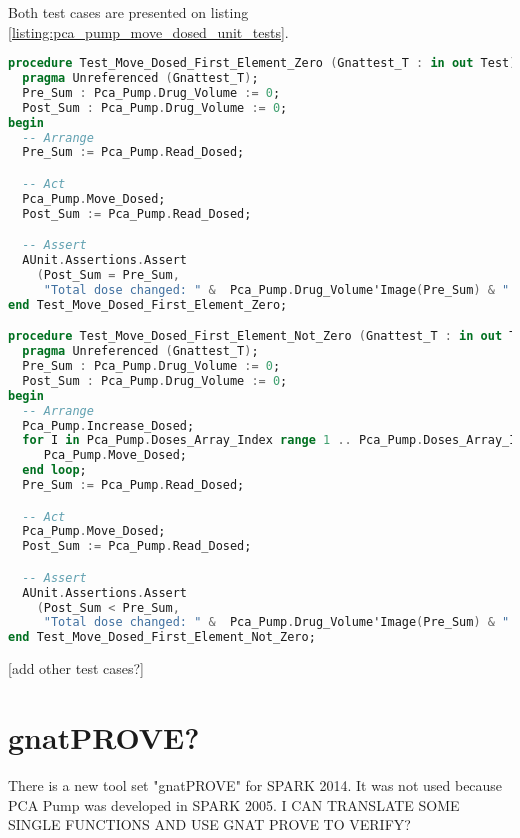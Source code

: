 Both test cases are presented on listing \ref{listing:pca_pump_move_dosed_unit_tests}.

\begin{lstlisting}[language=ada, frame=single, gobble=0, caption={AUnit tests for Move\_Dosed procedure}, label={listing:pca_pump_move_dosed_unit_tests}]
procedure Test_Move_Dosed_First_Element_Zero (Gnattest_T : in out Test) is
  pragma Unreferenced (Gnattest_T);
  Pre_Sum : Pca_Pump.Drug_Volume := 0;
  Post_Sum : Pca_Pump.Drug_Volume := 0;
begin
  -- Arrange
  Pre_Sum := Pca_Pump.Read_Dosed;

  -- Act
  Pca_Pump.Move_Dosed;
  Post_Sum := Pca_Pump.Read_Dosed;

  -- Assert
  AUnit.Assertions.Assert
    (Post_Sum = Pre_Sum,
     "Total dose changed: " &  Pca_Pump.Drug_Volume'Image(Pre_Sum) & " /= " &  Pca_Pump.Drug_Volume'Image(Post_Sum));
end Test_Move_Dosed_First_Element_Zero;

procedure Test_Move_Dosed_First_Element_Not_Zero (Gnattest_T : in out Test) is
  pragma Unreferenced (Gnattest_T);
  Pre_Sum : Pca_Pump.Drug_Volume := 0;
  Post_Sum : Pca_Pump.Drug_Volume := 0;
begin
  -- Arrange
  Pca_Pump.Increase_Dosed;
  for I in Pca_Pump.Doses_Array_Index range 1 .. Pca_Pump.Doses_Array_Index'Last-1 loop
     Pca_Pump.Move_Dosed;
  end loop;
  Pre_Sum := Pca_Pump.Read_Dosed;

  -- Act
  Pca_Pump.Move_Dosed;
  Post_Sum := Pca_Pump.Read_Dosed;

  -- Assert
  AUnit.Assertions.Assert
    (Post_Sum < Pre_Sum,
     "Total dose changed: " &  Pca_Pump.Drug_Volume'Image(Pre_Sum) & " should be greater than " &  Pca_Pump.Drug_Volume'Image(Post_Sum));
end Test_Move_Dosed_First_Element_Not_Zero;
\end{lstlisting}

[add other test cases?]


\section{gnatPROVE?}
\label{verification:gnatprove}

There is a new tool set "gnatPROVE" for SPARK 2014. It was not used because PCA Pump was developed in SPARK 2005.
I CAN TRANSLATE SOME SINGLE FUNCTIONS AND USE GNAT PROVE TO VERIFY?
